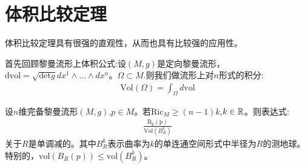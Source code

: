 \section{体积比较定理}
体积比较定理具有很强的直观性，从而也具有比较强的应用性。

首先回顾黎曼流形上体积公式:设$(M,g)$是定向黎曼流形，$\mathrm{dvol}=\sqrt{\mathrm{det}g}dx^1 \wedge \dots \wedge dx^n$。$\Omega \subset M$.则我们做流形上对$n$形式的积分:
\begin{align*}
    \mathrm{Vol}(\Omega)=\int_\Omega d\mathrm{vol}
\end{align*}
\begin{theorem}
    设$n$维完备黎曼流形$(M,g)$,$p \in M$。若$\mathrm{Ric}_M \geq (n-1)k$,$k \in \mathbb{R}$。则表达式:
    \begin{align*}
        \frac{\mathrm{B_k(p)}}{\mathrm{Vol}(B_R^k)}
    \end{align*}
    关于$R$是单调减的。其中$B_R^k$表示曲率为$k$的单连通空间形式中半径为$R$的测地球。特别的，$\mathrm{vol}(B_R(p))\leq \mathrm{vol}(B_R^k)$。
\end{theorem}
